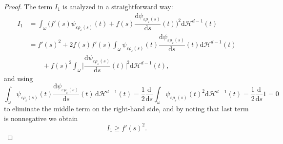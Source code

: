 \documentclass[10pt,a4paper]{amsart}
\newcommand{\dd}{\mathrm{d}}
\newcommand{\eps}{\varepsilon}
\renewcommand{\H}{\mathcal{H}}
\begin{document}
\begin{proof}
The term $I_1$ is analyzed in a straightforward way:
\begin{align*}
	I_1&=
	\int_\omega \Big( f'(s)\psi_{\eps \rho_\eps(s)}(t)+f(s)\dfrac{\dd \psi_{\eps\rho_\eps(s)}}{\dd s}(t)\Big)^2\dd\H^{d-1}(t)\\
	&=f'(s)^2+2f(s)f'(s)\int_\omega \psi_{\eps \rho_\eps(s)}(t)\dfrac{\dd \psi_{\eps\rho_\eps(s)}}{\dd s}(t)\dd\H^{d-1}(t)\\
	&\qquad+f(s)^2\int_\omega \Big|\dfrac{\dd \psi_{\eps\rho_\eps(s)}}{\dd s}(t)\Big|^2\dd\H^{d-1}(t),
\end{align*}
and using 
\[
\int_\omega \psi_{\eps \rho_\eps(s)}(t)\dfrac{\dd \psi_{\eps\rho_\eps(s)}}{\dd s}(t)\,\dd\H^{d-1}(t)
=\dfrac{1}{2}\dfrac{\dd}{\dd s}\int_\omega \psi_{\eps \rho_\eps(s)}(t)^2\dd\H^{d-1}(t)
=\dfrac{1}{2}\dfrac{\dd}{\dd s} 1=0
\]
to eliminate the middle term on the right-hand side, and by noting that last term is nonnegative we obtain
\begin{equation}
	\label{eq-i1}
	I_1\ge f'(s)^2.
\end{equation}	


\end{proof}
\end{document}
